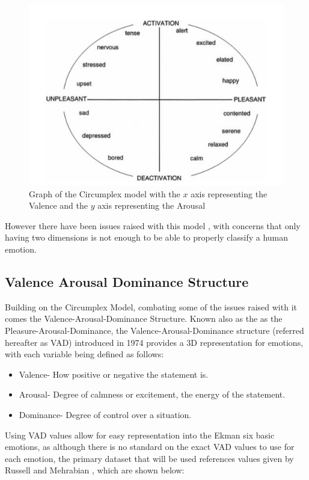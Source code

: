 \begin{figure}[h]
\caption{Graph of the Circumplex model with the $x$ axis representing the Valence and the $y$ axis representing the Arousal}
\centering
\includegraphics[scale=0.4]{./LitReview/images/circumplex.png}
\end{figure}

However there have been issues raised with this model \cite{circumplexIssues},  with concerns that only having two dimensions is not enough to be able to properly classify a human emotion.

\subsection{Valence Arousal Dominance Structure}
Building on the Circumplex Model, combating some of the issues raised with it comes the Valence-Arousal-Dominance Structure.
Known also as the as the Pleasure-Arousal-Dominance, the Valence-Arousal-Dominance structure (referred hereafter as VAD) introduced in 1974 \cite{PAD} \cite{VAD} provides a 3D representation for emotions, with each variable being defined as follows:
\begin{itemize}
    \item Valence- How positive or negative the statement is.
    \item Arousal- Degree of calmness or excitement, the energy of the statement. 
    \item Dominance- Degree of control over a situation.
\end{itemize}

Using VAD values allow for easy representation into the Ekman six basic emotions, as although there is no standard on the exact VAD values to use for each emotion, the primary dataset that will be used references values given by Russell and Mehrabian \cite{VADMapping}, which are shown below:

